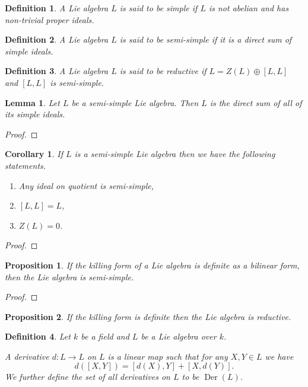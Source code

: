 \documentclass{article}
\newtheorem{proposition}{Proposition}[section]
\newtheorem{definition}{Definition}[section]
\newtheorem{lemma}{Lemma}[section]
\newtheorem{corollary}{Corollary}[section]
\numberwithin{equation}{section}
\DeclareMathOperator{\Der}{Der}
\begin{document}
\begin{definition}
A Lie algebra $L$ is said to be simple if $L$ is not abelian and has non-trivial proper ideals. %
\end{definition}

\begin{definition}
A Lie algebra $L$ is said to be semi-simple if it is a direct sum of simple ideals.
\end{definition}

\begin{definition}
A Lie algebra $L$ is said to be reductive if $L=Z(L)\oplus[L,L]$ and $[L,L]$ is semi-simple.
\end{definition}

\begin{lemma}
Let $L$ be a semi-simple Lie algebra. Then $L$ is the direct sum of all of its simple ideals.
\end{lemma}

\begin{proof}
\end{proof}

\begin{corollary}
If $L$ is a semi-simple Lie algebra then we have the following statements.
\begin{enumerate}
\item Any ideal on quotient is semi-simple,
\item $[L,L]=L$,
\item $Z(L)=0$.
\end{enumerate}
\end{corollary}

\begin{proof}
\end{proof}


\begin{proposition}
If the killing form of a Lie algebra is definite as a bilinear form, then the Lie algebra is semi-simple.
\end{proposition}

\begin{proof}
\end{proof}

\begin{proposition}
If the killing form is definite then the Lie algebra is reductive.
\end{proposition}

\begin{definition}
Let $k$ be a field and $L$ be a Lie algebra over $k$.\\
\par A derivative $d:L\to L$  on $L$ is a linear map such that for any $X,Y\in L$ we have
\begin{equation*}
d([X,Y]) = [d(X),Y] +[X,d(Y)].
\end{equation*}
We further define the set of all derivatives on $L$ to be $\Der(L)$.
\end{definition}
\end{document}
